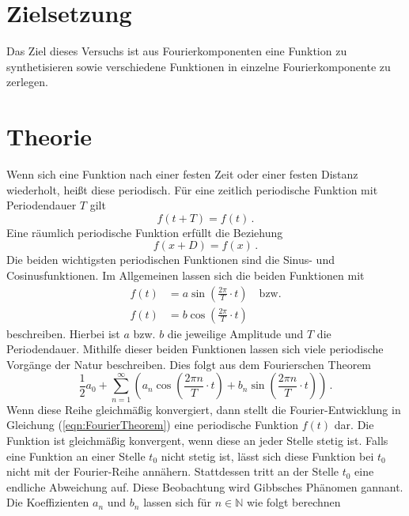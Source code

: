 \nocite{anleitungV351}
\section{Zielsetzung}
\label{sec:Zielsetzung}
Das Ziel dieses Versuchs ist aus Fourierkomponenten eine Funktion zu synthetisieren sowie verschiedene Funktionen 
in einzelne Fourierkomponente zu zerlegen. 
\section{Theorie}
\label{sec:Theorie}
Wenn sich eine Funktion nach einer festen Zeit oder einer festen Distanz wiederholt, heißt diese periodisch. Für eine
zeitlich periodische Funktion mit Periodendauer $T$ gilt
\begin{equation}
    f(t+T) = f(t)\,.
    \label{eqn:zeitlichPeriodisch}
\end{equation}
Eine räumlich periodische Funktion erfüllt die Beziehung 
\begin{equation}
    f(x+D) = f(x)\,.
    \label{eqn:räumlichPeriodisch}
\end{equation}
Die beiden wichtigsten periodischen Funktionen sind die Sinus- und Cosinusfunktionen. Im Allgemeinen lassen sich die beiden
Funktionen mit 
\begin{align}
    f(t)& = a\sin\left(\frac{2\pi}{T}\cdot t\right)\quad\text{bzw.} \label{eqn:allgSinus}\\
    f(t)& = b\cos\left(\frac{2\pi}{T}\cdot t\right) \label{eqn:allgCosinus}
\end{align}
beschreiben. Hierbei ist $a$ bzw. $b$ die jeweilige Amplitude und $T$ die Periodendauer. Mithilfe dieser beiden Funktionen 
lassen sich viele periodische Vorgänge der Natur beschreiben. Dies folgt aus dem Fourierschen Theorem
\begin{equation}
    \frac{1}{2}a_0 + \sum_{n=1}^{\infty}\left(a_n\cos\left(\frac{2\pi n}{T}\cdot t\right)+b_n\sin\left(\frac{2\pi n}{T}\cdot t\right)\right)\,.
    \label{eqn:FourierTheorem}
\end{equation}
Wenn diese Reihe gleichmäßig konvergiert, dann stellt die Fourier-Entwicklung in Gleichung (\ref{eqn:FourierTheorem}) eine periodische 
Funktion $f(t)$ dar. Die Funktion ist gleichmäßig konvergent, wenn diese an jeder Stelle stetig ist. Falls eine Funktion an einer Stelle $t_0$
nicht stetig ist, lässt sich diese Funktion bei $t_0$ nicht mit der Fourier-Reihe annähern. Stattdessen tritt an der Stelle $t_0$ eine endliche Abweichung
auf. Diese Beobachtung wird Gibbsches Phänomen gannant. Die Koeffizienten $a_n$ und $b_n$ lassen sich für $n \in \mathbb{N}$ wie folgt berechnen
